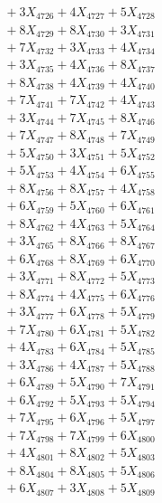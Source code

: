 \documentclass[a4paper,10pt]{article}
\begin{document}
{\begin{align}
&\;  + 3 X_{4726} + 4 X_{4727} + 5 X_{4728} \\[0.3ex]
&\;  + 8 X_{4729} + 8 X_{4730} + 3 X_{4731} \\[0.3ex]
&\;  + 7 X_{4732} + 3 X_{4733} + 4 X_{4734} \\[0.3ex]
&\;  + 3 X_{4735} + 4 X_{4736} + 8 X_{4737} \\[0.3ex]
&\;  + 8 X_{4738} + 4 X_{4739} + 4 X_{4740} \\[0.3ex]
&\;  + 7 X_{4741} + 7 X_{4742} + 4 X_{4743} \\[0.3ex]
&\;  + 3 X_{4744} + 7 X_{4745} + 8 X_{4746} \\[0.3ex]
&\;  + 7 X_{4747} + 8 X_{4748} + 7 X_{4749} \\[0.5ex]\allowbreak
&\;  + 5 X_{4750} + 3 X_{4751} + 5 X_{4752} \\[0.3ex]
&\;  + 5 X_{4753} + 4 X_{4754} + 6 X_{4755} \\[0.3ex]
&\;  + 8 X_{4756} + 8 X_{4757} + 4 X_{4758} \\[0.3ex]
&\;  + 6 X_{4759} + 5 X_{4760} + 6 X_{4761} \\[0.3ex]
&\;  + 8 X_{4762} + 4 X_{4763} + 5 X_{4764} \\[0.3ex]
&\;  + 3 X_{4765} + 8 X_{4766} + 8 X_{4767} \\[0.3ex]
&\;  + 6 X_{4768} + 8 X_{4769} + 6 X_{4770} \\[0.3ex]
&\;  + 3 X_{4771} + 8 X_{4772} + 5 X_{4773} \\[0.3ex]
&\;  + 8 X_{4774} + 4 X_{4775} + 6 X_{4776} \\[0.3ex]
&\;  + 3 X_{4777} + 6 X_{4778} + 5 X_{4779} \\[0.5ex]\allowbreak
&\;  + 7 X_{4780} + 6 X_{4781} + 5 X_{4782} \\[0.3ex]
&\;  + 4 X_{4783} + 6 X_{4784} + 5 X_{4785} \\[0.3ex]
&\;  + 3 X_{4786} + 4 X_{4787} + 5 X_{4788} \\[0.3ex]
&\;  + 6 X_{4789} + 5 X_{4790} + 7 X_{4791} \\[0.3ex]
&\;  + 6 X_{4792} + 5 X_{4793} + 5 X_{4794} \\[0.3ex]
&\;  + 7 X_{4795} + 6 X_{4796} + 5 X_{4797} \\[0.3ex]
&\;  + 7 X_{4798} + 7 X_{4799} + 6 X_{4800} \\[0.3ex]
&\;  + 4 X_{4801} + 8 X_{4802} + 5 X_{4803} \\[0.3ex]
&\;  + 8 X_{4804} + 8 X_{4805} + 5 X_{4806} \\[0.3ex]
&\;  + 6 X_{4807} + 3 X_{4808} + 5 X_{4809} \\[0.5ex]\allowbreak

\end{align}}
\end{document}
